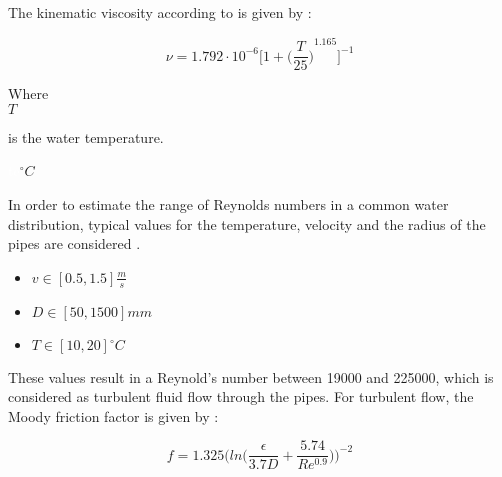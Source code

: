 The kinematic viscosity according to \cite{Design_Water} is given by :

\begin{equation}
  \nu = 1.792 \cdot 10^{-6} \Bigg[1+{\bigg(\frac{T}{25}\bigg)}^{1.165} \Bigg]^{-1}
\end{equation}

  \begin{minipage}[t]{0.20\textwidth}
Where\\
\hspace*{8mm} $T$ 
\end{minipage}
\begin{minipage}[t]{0.68\textwidth}
\vspace*{2mm}
is the water temperature.
 \end{minipage}
\begin{minipage}[t]{0.10\textwidth}
\vspace*{2mm}
\textcolor{White}{te}$\unit{^{\circ} C}$
\end{minipage}

In order to estimate the range of Reynolds numbers in a common water 
distribution, typical values for the temperature, velocity and the radius of 
the pipes are considered \cite{Urban_Design}. 


\begin{itemize}
  \item $ v \in [0.5,1.5] \unit{\frac{m}{s}}$
  \item $ D \in [50,1500]\unit{mm}$
  \item $T \in [10,20] \unit{^{\circ} C} $
\end{itemize}

These values result in a Reynold's number between 19000 and 225000, which is considered as turbulent fluid flow through the pipes. For turbulent flow, the 
Moody friction factor is given by \cite{Design_Water}: 

\begin{equation}
  f = 1.325 \bigg(ln\bigg(\frac{\epsilon}{3.7 D}+\frac{5.74}{Re^{0.9}}\bigg)\bigg)^{-2}
  \label{turbulent}
\end{equation}

